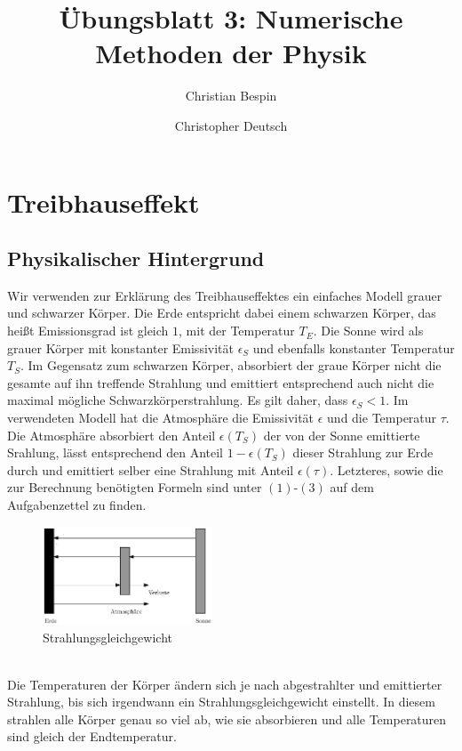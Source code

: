 \documentclass[10pt,a4paper]{article}
\author{Christian Bespin \and Christopher Deutsch}
\title{Übungsblatt 3: Numerische Methoden der Physik}
\begin{document}
\maketitle

\setcounter{section}{1}

\section{Treibhauseffekt}

\subsection{Physikalischer Hintergrund}

Wir verwenden zur Erklärung des Treibhauseffektes ein einfaches Modell grauer und schwarzer Körper. Die Erde entspricht dabei einem schwarzen Körper, das heißt Emissionsgrad ist gleich $1$, mit der Temperatur $T_E$. Die Sonne wird als grauer Körper mit konstanter Emissivität $\epsilon_S$ und ebenfalls konstanter Temperatur $T_S$. Im Gegensatz zum schwarzen Körper, absorbiert der graue Körper nicht die gesamte auf ihn treffende Strahlung und emittiert entsprechend auch nicht die maximal mögliche Schwarzkörperstrahlung. Es gilt daher, dass $\epsilon_{S}<1$. Im verwendeten Modell hat die Atmosphäre die Emissivität $\epsilon$ und die Temperatur $\tau$. Die Atmosphäre absorbiert den Anteil $\epsilon(T_S)$ der von der Sonne emittierte Srahlung, lässt entsprechend den Anteil $1-\epsilon(T_S)$ dieser Strahlung zur Erde durch und emittiert selber eine Strahlung mit Anteil $\epsilon(\tau)$. Letzteres, sowie die zur Berechnung benötigten Formeln sind unter $(1)$-$(3)$ auf dem Aufgabenzettel zu finden.\\
\begin{figure}
\centering
\includegraphics[width=0.45\textwidth]{./figures/strahlungsgleichgewicht.eps}
\caption{Strahlungsgleichgewicht}
\label{fig:strahlungsgleichgewicht}
\end{figure}
\\
Die Temperaturen der Körper ändern sich je nach abgestrahlter und emittierter Strahlung, bis sich irgendwann ein Strahlungsgleichgewicht einstellt. In diesem strahlen alle Körper genau so viel ab, wie sie absorbieren und alle Temperaturen sind gleich der Endtemperatur.
\end{document}
